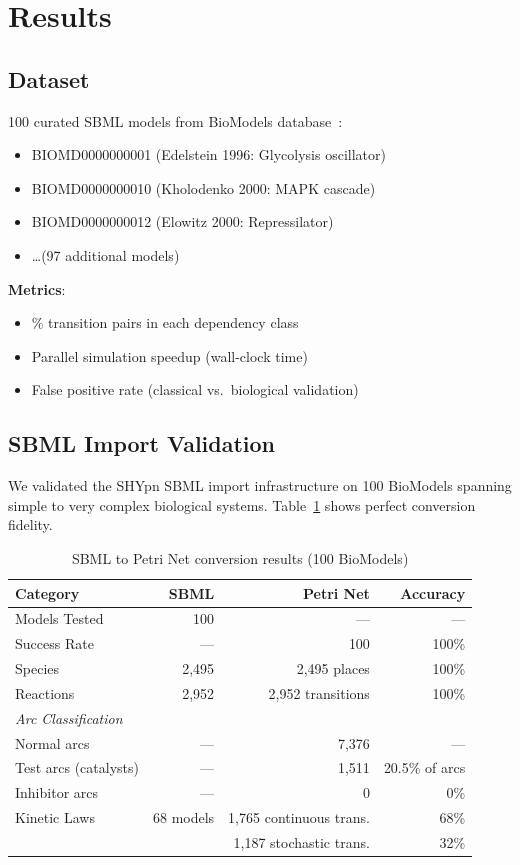 \documentclass{article}
\begin{document}
\section{Results}

\subsection{Dataset}

100 curated SBML models from BioModels database~\cite{Malik-Sheriff2020}:
\begin{itemize}
    \item BIOMD0000000001 (Edelstein 1996: Glycolysis oscillator)
    \item BIOMD0000000010 (Kholodenko 2000: MAPK cascade)
    \item BIOMD0000000012 (Elowitz 2000: Repressilator)
    \item \ldots (97 additional models)
\end{itemize}

\textbf{Metrics}:
\begin{itemize}
    \item \% transition pairs in each dependency class
    \item Parallel simulation speedup (wall-clock time)
    \item False positive rate (classical vs.\ biological validation)
\end{itemize}

\subsection{SBML Import Validation}

We validated the SHYpn SBML import infrastructure on 100 BioModels spanning simple to very complex biological systems. Table~\ref{tab:sbml-import-real} shows perfect conversion fidelity.

\begin{table}[t]
\centering
\caption{SBML to Petri Net conversion results (100 BioModels)}
\label{tab:sbml-import-real}
\begin{tabular}{lrrr}
\toprule
\textbf{Category} & \textbf{SBML} & \textbf{Petri Net} & \textbf{Accuracy} \\
\midrule
Models Tested & 100 & --- & --- \\
Success Rate & --- & 100 & 100\% \\
\midrule
Species & 2,495 & 2,495 places & 100\% \\
Reactions & 2,952 & 2,952 transitions & 100\% \\
\midrule
\multicolumn{4}{l}{\textit{Arc Classification}} \\
Normal arcs & --- & 7,376 & --- \\
Test arcs (catalysts) & --- & 1,511 & 20.5\% of arcs \\
Inhibitor arcs & --- & 0 & 0\% \\
\midrule
Kinetic Laws & 68 models & 1,765 continuous trans. & 68\% \\
& & 1,187 stochastic trans. & 32\% \\
\bottomrule
\end{tabular}
\end{table}
\end{document}

